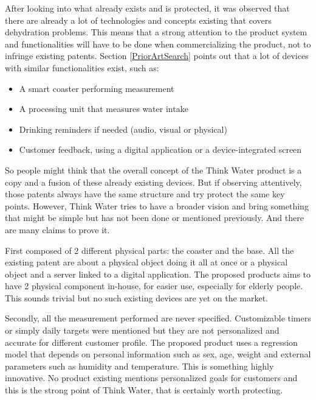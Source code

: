 \documentclass{article}
\begin{document}
After looking into what already exists and is protected, it was observed that there are already a lot of technologies and concepts existing that covers dehydration problems. This means that a strong attention to the product system and functionalities will have to be done when commercializing the product, not to infringe existing patents. Section \ref{PriorArtSearch} points out that a lot of devices with similar functionalities exist, such as:
\begin{itemize}
    \item A smart coaster performing measurement 
    \item A processing unit that measures water intake
    \item Drinking reminders if needed (audio, visual or physical)
    \item Customer feedback, using a digital application or a device-integrated screen
\end{itemize}
So people might think that the overall concept of the Think Water product is a copy and a fusion of these already existing devices. But if observing attentively, those patents always have the same structure and try protect the same key points. However, Think Water tries to have a broader vision and bring something that might be simple but has not been done or mentioned previously. And there are many claims to prove it.\vspace{0.2cm}

First composed of 2 different physical parts: the coaster and the base. All the existing patent are about a physical object doing it all at once or a physical object and a server linked to a digital application. The proposed products aims to have 2 physical component in-house, for easier use, especially for elderly people. This sounds trivial but no such existing devices are yet on the market.\vspace{0.2cm}

Secondly, all the measurement performed are never specified. Customizable timers or simply daily targets were mentioned but they are not personalized and accurate for different customer profile. The proposed product uses a regression model that depends on personal information such as sex, age, weight and external parameters such as humidity and temperature. This is something highly innovative. No product existing mentions personalized goals for customers and this is the strong point of Think Water, that is certainly worth protecting.\vspace{0.2cm}
\end{document}
